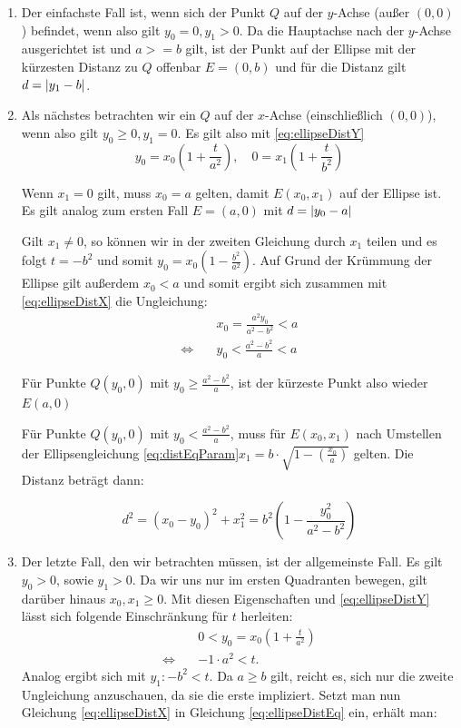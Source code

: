 \begin{enumerate}
	\item Der einfachste Fall ist, wenn sich der Punkt $Q$ auf der $y$-Achse (außer $(0,0)$) befindet, wenn also gilt $y_0 = 0, y_1 > 0$.
	Da die Hauptachse nach der $y$-Achse ausgerichtet ist und $a >= b$ gilt, ist der Punkt auf der Ellipse mit der kürzesten Distanz zu $Q$ offenbar $E = (0, b)$ und für die Distanz gilt $d = \lvert y_1 - b\rvert$.
	\item Als nächstes betrachten wir ein $Q$ auf der $x$-Achse (einschließlich $(0,0)$), wenn also gilt  $y_0 \geq 0, y_1 = 0$. Es gilt also mit \ref{eq:ellipseDistY}
	\[
		y_0 = x_0\left(1 + \frac{t}{a^2}\right), \quad 0 = x_1\left(1 + \frac{t}{b^2}\right)
	\]
	
	Wenn $x_1 = 0$ gilt, muss $x_0 = a$ gelten, damit $E(x_0,x_1)$ auf der Ellipse ist. Es  gilt analog zum ersten Fall $E=(a,0)$ mit $d = \lvert y_0 - a\rvert$ 
	
	Gilt $x_1 \neq 0$, so können wir in der zweiten Gleichung durch $x_1$ teilen und es folgt $t = -b^2$ und somit $y_0 = x_0\left(1 - \frac{b^2}{a^2}\right)$. Auf Grund der Krümmung der Ellipse gilt außerdem $x_0 < a$ und somit ergibt sich zusammen mit \ref{eq:ellipseDistX} die Ungleichung:
	\begin{equation*}
	\begin{aligned}
		&x_0 = \frac{a^2y_0}{a^2 - b^2} < a \\
		\Leftrightarrow\quad &y_0 < \frac{a^2 - b^2}{a} < a
	\end{aligned}
	\end{equation*}
		
	Für Punkte $Q(y_0,0)$ mit $y_0 \geq \frac{a^2 - b^2}{a}$, ist der kürzeste Punkt also wieder $E(a,0)$
	
	Für Punkte $Q(y_0,0)$ mit $y_0 < \frac{a^2 - b^2}{a}$, muss für $E(x_0,x_1)$ nach Umstellen der Ellipsengleichung \ref{eq:distEqParam}\quad$x_1 = b\cdot\sqrt{1-\left(\frac{x_0}{a}\right)}$ gelten. 
	Die Distanz beträgt dann:

	\[
		d^2 = (x_0 - y_0)^2 + x_1^2 = b^2\left(1 - \frac{y_0^2}{a^2 - b^2}\right)
	\]
	\item Der letzte Fall, den wir betrachten müssen, ist der allgemeinste Fall. Es gilt $y_0 > 0$, sowie $y_1 > 0$. Da wir uns nur im ersten Quadranten bewegen, gilt darüber hinaus $x_0, x_1 \geq 0$. Mit diesen Eigenschaften und \ref{eq:ellipseDistY} lässt sich folgende Einschränkung für $t$ herleiten:
\[
	\begin{aligned}
	& 0 < y_0 = x_0\left(1 + \frac{t}{a^2}\right)\\
	\Leftrightarrow\quad& -1\cdot a^2 < t.
	\end{aligned}
\]
	Analog ergibt sich mit $y_1\colon -b^2 < t$. Da $a\geq b$ gilt, reicht es, sich nur die zweite Ungleichung anzuschauen, da sie die erste impliziert. Setzt man nun Gleichung \ref{eq:ellipseDistX} in Gleichung \ref{eq:ellipseDistEq} ein, erhält man:
	

\end{enumerate}
